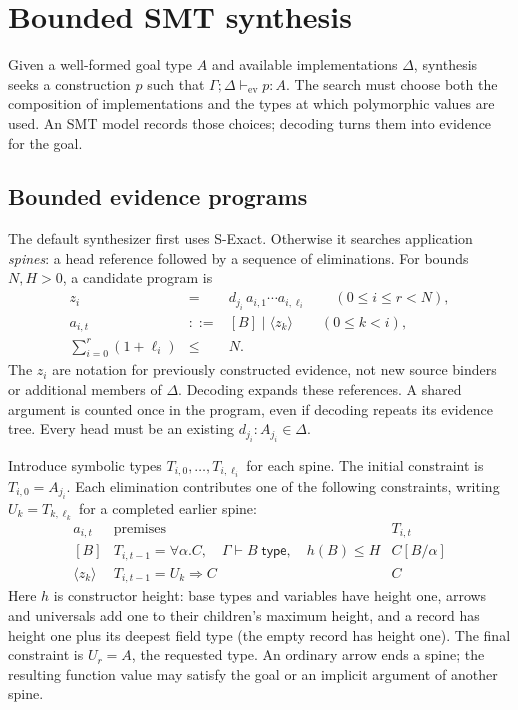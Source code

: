 \documentclass[10pt,a4paper]{article}
\newcommand{\wf}[1]{\Gamma\vdash #1\;\mathsf{type}}
\newcommand{\Pj}[2]{\Gamma;\Delta\vdash_{\mathrm{ev}} #1:#2}
\newcommand{\iarg}[1]{\langle#1\rangle}
\begin{document}
\newpage
\section{Bounded SMT synthesis}
\label{sec:smt}
Given a well-formed goal type $A$ and available implementations $\Delta$, synthesis
seeks a construction $p$ such that $\Pj p A$. The search must choose both the
composition of implementations and the types at which polymorphic values are used.
An SMT model records those choices; decoding turns them into evidence for the goal.

\subsection{Bounded evidence programs}
\label{sec:bounded-programs}
The default synthesizer first uses S-Exact. Otherwise it searches application
\emph{spines}: a head reference followed by a sequence of eliminations. For bounds
$N,H>0$, a candidate program is
\[
\begin{array}{rcl}
 z_i&=&d_{j_i}\,a_{i,1}\cdots a_{i,\ell_i}\qquad(0\le i\le r<N),\\
 a_{i,t}&::=&[B]\mid\iarg{z_k}\qquad(0\le k<i),\\
 \displaystyle\sum_{i=0}^{r}(1+\ell_i)&\le&N.
\end{array}
\]
The $z_i$ are notation for previously constructed evidence, not new source binders
or additional members of $\Delta$. Decoding expands these references. A shared
argument is counted once in the program, even if decoding repeats its evidence tree.
Every head must be an existing $d_{j_i}:A_{j_i}\in\Delta$.

Introduce symbolic types $T_{i,0},\ldots,T_{i,\ell_i}$ for each spine. The initial
constraint is $T_{i,0}=A_{j_i}$. Each elimination contributes one of the following
constraints, writing $U_k=T_{k,\ell_k}$ for a completed earlier spine:
\[
\begin{array}{c|l|l}
a_{i,t}&\text{premises}&T_{i,t}\\ \hline
[B]&T_{i,t-1}=\forall\alpha.C,\quad\wf B,\quad h(B)\le H&C[B/\alpha]\\
\iarg{z_k}&T_{i,t-1}=U_k\Rightarrow C&C
\end{array}
\]
Here $h$ is constructor height: base types and variables have height one,
arrows and universals add one to their children's maximum height, and a record
has height one plus its deepest field type (the empty record has height one).
The final constraint is $U_r=A$, the requested type. An ordinary arrow ends a spine;
the resulting function value may satisfy the goal or an implicit argument of another spine.
\end{document}

